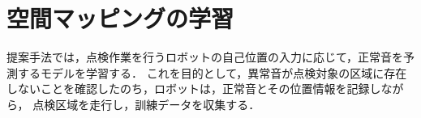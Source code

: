 \documentclass[../main]{subfiles}
\begin{document}
\section{空間マッピングの学習}

提案手法では，点検作業を行うロボットの自己位置の入力に応じて，正常音を予測するモデルを学習する．
これを目的として，異常音が点検対象の区域に存在しないことを確認したのち，ロボットは，正常音とその位置情報を記録しながら，
点検区域を走行し，訓練データを収集する．
\label{sec:pmethod_mapping}
\end{document}
